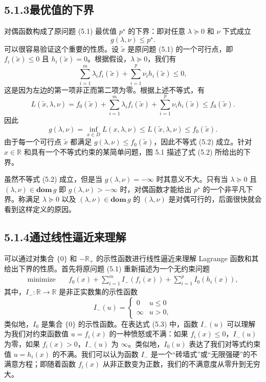 \documentclass[UTF8, 12pt, fontset=fandol, oneside]{ctexart}
\begin{document}
\subsection*{5.1.3\quad 最优值的下界}

对偶函数构成了原问题 (5.1) 最优值 $p^\star$ 的下界：即对任意 $\lambda\succeq 0$ 和 $\nu$ 下式成立
\begin{equation}
g(\lambda,\nu)\leq p^\star.
\tag{5.2}
\end{equation}
可以很容易验证这个重要的性质。设 $\tilde{x}$ 是原问题 (5.1) 的一个可行点，即 $f_i(\tilde{x})\leq 0$ 且 $h_i(\tilde{x})=0$。根据假设，$\lambda\succeq 0$，我们有
\[
\sum_{i=1}^m \lambda_i f_i(\tilde{x})+\sum_{i=1}^p \nu_i h_i(\tilde{x})\leq 0,
\]
这是因为左边的第一项非正而第二项为零。根据上述不等式，有
\[
L(\tilde{x},\lambda,\nu)=f_0(\tilde{x})+\sum_{i=1}^m \lambda_i f_i(\tilde{x})+\sum_{i=1}^p \nu_i h_i(\tilde{x})\leq f_0(\tilde{x}).
\]
因此
\[
g(\lambda,\nu)=\inf_{x\in D}L(x,\lambda,\nu)\leq L(\tilde{x},\lambda,\nu)\leq f_0(\tilde{x}).
\]
由于每一个可行点 $\tilde{x}$ 都满足 $g(\lambda,\nu)\leq f_0(\tilde{x})$，因此不等式 (5.2) 成立。针对 $x\in\mathbb{R}$ 和具有一个不等式约束的某简单问题，图 5.1 描述了式 (5.2) 所给出的下界。

虽然不等式 (5.2) 成立，但是当 $g(\lambda,\nu)=-\infty$ 时其意义不大。只有当 $\lambda\succeq 0$ 且 $(\lambda,\nu)\in\mathbf{dom}\,g$ 即 $g(\lambda,\nu)>-\infty$ 时，对偶函数才能给出 $p^\star$ 的一个非平凡下界。称满足 $\lambda\succeq 0$ 以及 $(\lambda,\nu)\in\mathbf{dom}\,g$ 的 $(\lambda,\nu)$ 是对偶可行的，后面很快就会看到这样定义的原因。

\subsection*{5.1.4\quad 通过线性逼近来理解}

可以通过对集合 $\{0\}$ 和 $-\mathbb{R}_+$ 的示性函数进行线性逼近来理解 Lagrange 函数和其给出下界的性质。首先将原问题 (5.1) 重新描述为一个无约束问题
\begin{equation}
\begin{aligned}
\text{minimize}\quad
& f_0(x)+\sum_{i=1}^m I_-(f_i(x))+\sum_{i=1}^p I_0(h_i(x)),
\end{aligned}
\tag{5.3}
\end{equation}
其中，$I_-:\mathbb{R}\to\mathbb{R}$ 是非正实数集的示性函数
\[
I_-(u)=
\begin{cases}
0 & u\leq 0\\
\infty & u>0,
\end{cases}
\]
类似地，$I_0$ 是集合 $\{0\}$ 的示性函数。在表达式 (5.3) 中，函数 $I_-(u)$ 可以理解为我们对约束函数值 $u=f_i(x)$ 的一种愤怒或不满：如果 $f_i(x)\leq 0$，$I_-(u)$ 为零，如果 $f_i(x)>0$，$I_-(u)$ 为 $\infty$。类似地，$I_0(u)$ 表达了我们对等式约束值 $u=h_i(x)$ 的不满。我们可以认为函数 $I_-$ 是一个``砖墙式''或``无限强硬''的不满意方程；即随着函数 $f_i(x)$ 从非正数变为正数，我们的不满意度从零升到无穷大。
\end{document}
